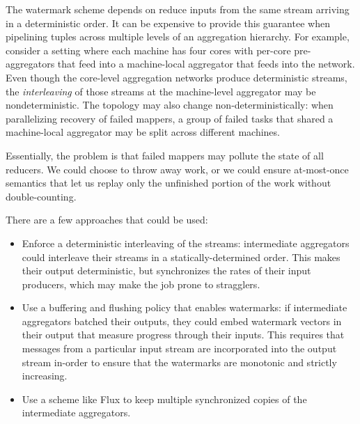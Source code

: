 \documentclass[twocolumn, 10pt]{article}
\begin{document}
The watermark scheme depends on reduce inputs from the same stream arriving in
a deterministic order.  It can be expensive to provide this guarantee when
pipelining tuples across multiple levels of an aggregation hierarchy.  For
example, consider a setting where each machine has four cores with per-core
pre-aggregators that feed into a machine-local aggregator that feeds into the
network.  Even though the core-level aggregation networks produce deterministic
streams, the \emph{interleaving} of those streams at the machine-level
aggregator may be nondeterministic.  The topology may also change
non-deterministically: when parallelizing recovery of failed mappers, a group
of failed tasks that shared a machine-local aggregator may be split across
different machines.

Essentially, the problem is that failed mappers may pollute the state of all
reducers.  We could choose to throw away work, or we could ensure at-most-once
semantics that let us replay only the unfinished portion of the work without
double-counting.

There are a few approaches that could be used:

\begin{itemize}
    \item Enforce a deterministic interleaving of the streams: intermediate
    aggregators could interleave their streams in a statically-determined
    order.  This makes their output deterministic, but synchronizes the rates
    of their input producers, which may make the job prone to stragglers.

    \item Use a buffering and flushing policy that enables watermarks:
    if intermediate aggregators batched their outputs, they could embed
    watermark vectors in their output that measure progress through their
    inputs.  This requires that messages from a particular input stream
    are incorporated into the output stream in-order to ensure that the
    watermarks are monotonic and strictly increasing.

    \item Use a scheme like Flux to keep multiple synchronized copies of the
    intermediate aggregators.

\end{itemize}




\end{document}
